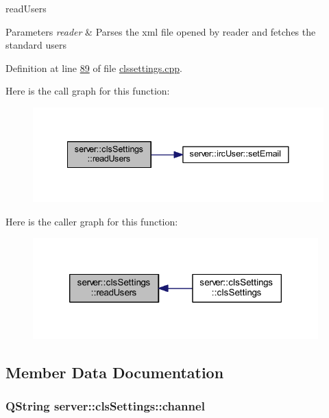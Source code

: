 read\-Users 


\begin{DoxyParams}{Parameters}
{\em reader} & Parses the xml file opened by reader and fetches the standard users \\
\hline
\end{DoxyParams}


Definition at line \hyperlink{custom_irc_server_2clssettings_8cpp_source_l00089}{89} of file \hyperlink{custom_irc_server_2clssettings_8cpp_source}{clssettings.\-cpp}.



Here is the call graph for this function\-:\nopagebreak
\begin{figure}[H]
\begin{center}
\leavevmode
\includegraphics[width=338pt]{d7/d81/classserver_1_1cls_settings_aa4eefe64194d1d21f5c9414355f3f5f3_cgraph}
\end{center}
\end{figure}




Here is the caller graph for this function\-:
\nopagebreak
\begin{figure}[H]
\begin{center}
\leavevmode
\includegraphics[width=312pt]{d7/d81/classserver_1_1cls_settings_aa4eefe64194d1d21f5c9414355f3f5f3_icgraph}
\end{center}
\end{figure}




\subsection{Member Data Documentation}
\hypertarget{classserver_1_1cls_settings_a13a2164fcd81177958521ec4171aa07c}{
\subsubsection[{channel}]{\setlength{\rightskip}{0pt plus 5cm}Q\-String server\-::cls\-Settings\-::channel\hspace{0.3cm}{\ttfamily [private]}}}\label{d7/d81/classserver_1_1cls_settings_a13a2164fcd81177958521ec4171aa07c}


